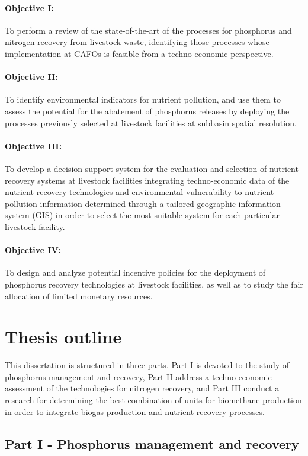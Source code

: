 \begin{refsection}[referencesCh1]
\paragraph{Objective I:} To perform a review of the state-of-the-art of the processes for phosphorus and nitrogen recovery from livestock waste, identifying those processes whose implementation at CAFOs is feasible from a techno-economic perspective.
\paragraph{Objective II:} To identify environmental indicators for nutrient pollution, and use  them to  assess the potential for the abatement of phosphorus releases by deploying the processes previously selected at livestock facilities at subbasin spatial resolution.
\paragraph{Objective III:} To develop a decision-support system for the evaluation and selection of nutrient recovery systems at livestock facilities integrating techno-economic data of the nutrient recovery technologies and environmental vulnerability to nutrient pollution information determined through a tailored geographic information system (GIS) in order to select  the most suitable system for each particular livestock facility.
\paragraph{Objective IV:} To design and analyze potential incentive policies for the deployment of phosphorus recovery technologies at livestock facilities, as well as to study the fair allocation of limited monetary resources.

\section{Thesis outline}
This dissertation is structured in three parts. Part I is devoted to the study of phosphorus management and recovery, Part II address a techno-economic assessment of the technologies for nitrogen recovery, and Part III conduct a research for determining the best combination of units for biomethane production in order to integrate biogas production and nutrient recovery processes.

\subsection{Part I - Phosphorus management and recovery}

\end{refsection}
